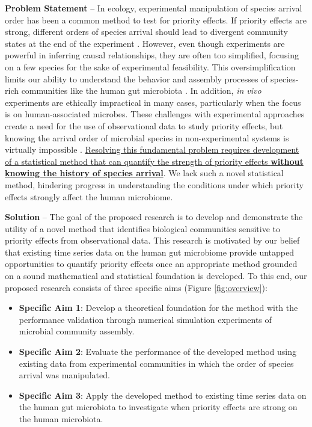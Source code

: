 \documentclass[12pt, class=article, crop=false]{standalone}
\begin{document}
\textbf{Problem Statement} --
In ecology, experimental manipulation of species arrival order has been a common method to test for priority effects.
If priority effects are strong, different orders of species arrival should lead to divergent community states at the end of the experiment \citep{fukami_historical_2015, sprockett_role_2018}.
However, even though experiments are powerful in inferring causal relationships, they are often too simplified, focusing on a few species for the sake of experimental feasibility.
This oversimplification limits our ability to understand the behavior and assembly processes of species-rich communities like the human gut microbiota \citep{fierer_animalcules_2012}. 
In addition, \textit{in vivo} experiments are ethically impractical in many cases, particularly when the focus is on human-associated microbes. 
These challenges with experimental approaches create a need for the use of observational data to study priority effects, but knowing the arrival order of microbial species in non-experimental systems is virtually impossible  \citep{sprockett_role_2018}.
\ul{Resolving this fundamental problem requires development of a statistical method that can quantify the strength of priority effects \textbf{without knowing the history of species arrival}}.
We lack such a novel statistical method, hindering progress in understanding the conditions under which priority effects strongly affect the human microbiome.

\textbf{Solution} --
The goal of the proposed research is to develop and demonstrate the utility of a novel method that identifies biological communities sensitive to priority effects from observational data.
This research is motivated by our belief that existing time series data on the human gut microbiome provide untapped opportunities to quantify priority effects once an appropriate method grounded on a sound mathematical and statistical foundation is developed.
To this end, our proposed research consists of three specific aims (Figure \ref{fig:overview}):

\begin{itemize}
    \item \textbf{Specific Aim 1}:  Develop a theoretical foundation for the method with the performance validation through numerical simulation experiments of microbial community assembly.
    \item \textbf{Specific Aim 2}: Evaluate the performance of the developed method using existing data from experimental communities in which the order of species arrival was manipulated.
    \item \textbf{Specific Aim 3}: Apply the developed method to existing time series data on the human gut microbiota to investigate when priority effects are strong on the human microbiota.
\end{itemize}
\end{document}
